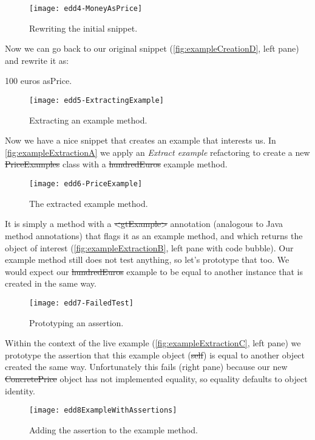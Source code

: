 \documentclass[sigplan,anonymous,review,10pt]{acmart}
\begin{document}
\begin{figure}[h]
  \texttt{[image: edd4-MoneyAsPrice]}
	\caption{Rewriting the initial snippet.}
  \label{fig:exampleCreationD}
\end{figure}

Now we can go back to our original snippet (\autoref{fig:exampleCreationD}, left pane) and rewrite it as:
\begin{code}
100 euros asPrice.
\end{code}

\begin{figure}[h]
  \texttt{[image: edd5-ExtractingExample]}
	\caption{Extracting an example method.}
  \label{fig:exampleExtractionA}
\end{figure}

Now we have a nice snippet that creates an example that interests us.
In \autoref{fig:exampleExtractionA} we apply an \emph{Extract example} refactoring to create a new \st{PriceExamples} class with a \st{hundredEuros} example  method.

\begin{figure}[h]
  \texttt{[image: edd6-PriceExample]}
	\caption{The extracted example method.}
  \label{fig:exampleExtractionB}
\end{figure}

It is simply a method with a \st{<gtExample>} annotation (analogous to Java method annotations) that flags it as an example method, and which returns the object of interest (\autoref{fig:exampleExtractionB}, left pane with code bubble).
Our example method still does not test anything, so let's prototype that too.
We would expect our \st{hundredEuros} example to be equal to another instance that is created in the same way.

\begin{figure}[h]
  \texttt{[image: edd7-FailedTest]}
	\caption{Prototyping an assertion.}
  \label{fig:exampleExtractionC}
\end{figure}

Within the context of the live example (\autoref{fig:exampleExtractionC}, left pane) we prototype the assertion that this example object (\ie \st{self}) is equal to another object created the same way.
Unfortunately this fails (right pane) because our new \st{ConcretePrice} object has not implemented equality, so equality defaults to object identity.

\begin{figure}[h]
  \texttt{[image: edd8ExampleWithAssertions]}
	\caption{Adding the assertion to the example method.}
  \label{fig:exampleExtractionD}
\end{figure}
\end{document}

